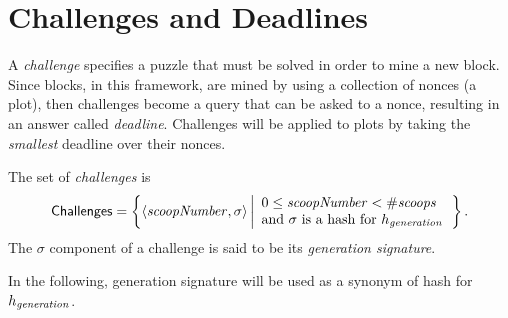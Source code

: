 \section{Challenges and Deadlines}\label{sec:challenges_and_deadlines}

A \emph{challenge} specifies a puzzle that must be solved in order to mine
a new block. Since blocks, in this framework, are mined by using a collection of nonces
(a plot), then challenges become a query that can be asked to a nonce, resulting
in an answer called \emph{deadline}.
Challenges will be applied to plots by taking
the \emph{smallest} deadline over their nonces.
%
\begin{definition}[Challenge]\label{def:challenge}
  The set of \emph{challenges} is
  \[
  {\mathsf{Challenges}}=\left\{\langle{\mathit{scoopNumber}},\sigma\rangle\left|
  \begin{array}{l}
    0\le{\mathit{scoopNumber}}<{\#\mathit{scoops}}\\
    \text{and $\sigma$ is a hash for $h_{\mathit{generation}}$}
  \end{array}
  \right.\right\}.
  \]
  The $\sigma$ component of a challenge is said to be its \emph{generation signature}.
\end{definition}
%
In the following, generation signature will be used as a synonym of hash for $h_{\mathit{generation}}$.

